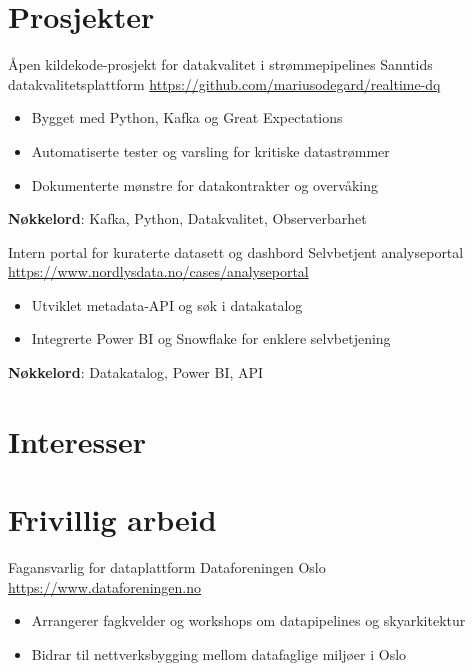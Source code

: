 \documentclass[a4paper, serif, 10pt]{moderncv}
\begin{document}
\section{Prosjekter}

        {Åpen kildekode-prosjekt for datakvalitet i strømmepipelines}
        {Sanntids datakvalitetsplattform}
        {\url{https://github.com/mariusodegard/realtime-dq}}
        {}
        {\begin{itemize}
\item Bygget med Python, Kafka og Great Expectations
\item Automatiserte tester og varsling for kritiske datastrømmer
\item Dokumenterte mønstre for datakontrakter og overvåking
\end{itemize}
\textbf{Nøkkelord}: Kafka, Python, Datakvalitet, Observerbarhet}

        {Intern portal for kuraterte datasett og dashbord}
        {Selvbetjent analyseportal}
        {\url{https://www.nordlysdata.no/cases/analyseportal}}
        {}
        {\begin{itemize}
\item Utviklet metadata-API og søk i datakatalog
\item Integrerte Power BI og Snowflake for enklere selvbetjening
\end{itemize}
\textbf{Nøkkelord}: Datakatalog, Power BI, API}
\section{Interesser}

\section{Frivillig arbeid}

        {Fagansvarlig for dataplattform}
        {Dataforeningen Oslo}
        {\url{https://www.dataforeningen.no}}
        {}
        {\begin{itemize}
\item Arrangerer fagkvelder og workshops om datapipelines og skyarkitektur
\item Bidrar til nettverksbygging mellom datafaglige miljøer i Oslo
\end{itemize}}
    
\end{document}
